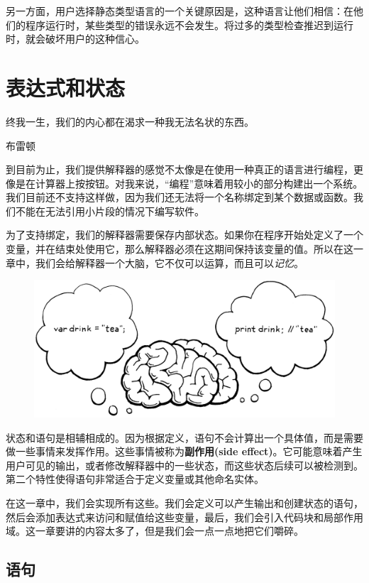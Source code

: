 \documentclass[cn,11pt,chinese]{elegantbook}
\begin{document}
另一方面，用户选择静态类型语言的一个关键原因是，这种语言让他们相信：在他们的程序运行时，某些类型的错误永远不会发生。将过多的类型检查推迟到运行时，就会破坏用户的这种信心。

\chapter{表达式和状态}

\epigraph{终我一生，我们的内心都在渴求一种我无法名状的东西。}{布雷顿}

到目前为止，我们提供解释器的感觉不太像是在使用一种真正的语言进行编程，更像是在计算器上按按钮。对我来说，“编程”意味着用较小的部分构建出一个系统。我们目前还不支持这样做，因为我们还无法将一个名称绑定到某个数据或函数。我们不能在无法引用小片段的情况下编写软件。

为了支持绑定，我们的解释器需要保存内部状态。如果你在程序开始处定义了一个变量，并在结束处使用它，那么解释器必须在这期间保持该变量的值。所以在这一章中，我们会给解释器一个大脑，它不仅可以运算，而且可以\textit{记忆}。

\begin{figure}[htbp]
  \centering
  \includegraphics[width=\textwidth]{image/statements-and-state/brain.png}
\end{figure}

状态和语句是相辅相成的。因为根据定义，语句不会计算出一个具体值，而是需要做一些事情来发挥作用。这些事情被称为\textbf{副作用(side effect)}。它可能意味着产生用户可见的输出，或者修改解释器中的一些状态，而这些状态后续可以被检测到。第二个特性使得语句非常适合于定义变量或其他命名实体。

在这一章中，我们会实现所有这些。我们会定义可以产生输出和创建状态的语句，然后会添加表达式来访问和赋值给这些变量，最后，我们会引入代码块和局部作用域。这一章要讲的内容太多了，但是我们会一点一点地把它们嚼碎。

\section{语句}
\end{document}
